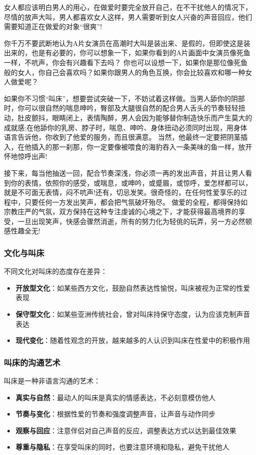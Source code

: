 \documentclass[12pt,UTF8]{ctexbook}
\begin{document}
女人都应该明白男人的用心，在做爱时要完全放开自己，在不干扰他人的情况下，尽情的放声大叫，男人都喜欢女人这样，男人需要听到女人兴奋的声音回应，他们需要知道正在做爱的对象“很爽”!

你千万不要武断地认为A片女演员在高潮时大叫是装出来、是假的，但即使这是装出来的，也是有必要的，你可以想象一下，如果你看到的A片画面中女演员像死鱼一样，不吭声，你会有兴趣看下去吗？
你也可以设想一下，如果你是那位像死鱼般的女人，你自己会喜欢吗？如果你跟男人的角色互换，你会比较喜欢和哪一种女人做爱呢？

如果你不习惯“叫床”，想要尝试突破一下，不妨试着这样做。当男人舔你的阴部时，你可以很自然的喘息呻吟，臀部及大腿很自然的配合男人舌头的节奏轻轻扭动，肚皮颤抖，眼睛闭上，表情陶醉，男人会因为能够替你制造快乐而产生莫大的成就感;在他舔你的乳房、脖子时，喘息、呻吟、身体扭动必须同时出现，用身体语言告诉他，你收到了他爱的服务，而且很满意。
当然，他最终一定要把阴茎插入，在他插入的那一刹那，你一定要像被喂食的海豹吞入一条美味的鱼一样，放开怀地惊呼出声!

接下来，每当他抽送一回，配合节奏深浅，你必须一再的发出声音，并且让男人看到你的表情，依照你的感受，或喘息，或呻吟，或蹙眉，或惊呼，爱怎样都可以，就是不可面无表情，闷不吭声!还有，切忌发笑。很奇怪的，在任何性爱享乐的过程中，只要任何一方发出笑声，都会把气氛破坏殆尽。
做爱的全程，都得保持如宗教庄严的气氛，双方保持在这种专注虔诚的心境之下，才能获得最高境界的享受，一旦出现笑声，快感会骤然消逝，所有的努力化为轻佻的玩弄，另一方必然顿感性趣全无!

\subsubsection{文化与叫床}
不同文化对叫床的态度存在差异：
\begin{itemize}
\item \textbf{开放型文化}：如某些西方文化，鼓励自然表达性愉悦，叫床被视为正常的性爱表现
\item \textbf{保守型文化}：如某些亚洲传统社会，曾对叫床持保守态度，认为应该克制声音表达
\item \textbf{现代变化}：随着性观念的开放，越来越多的人认识到叫床在性爱中的积极作用
\end{itemize}

\subsubsection{叫床的沟通艺术}
叫床是一种非语言沟通的艺术：
\begin{itemize}
\item \textbf{真实与自然}：最动人的叫床是真实的情感表达，不必刻意模仿他人
\item \textbf{节奏与变化}：根据性爱的节奏和强度调整声音，让声音与动作同步
\item \textbf{观察与回应}：注意伴侣对自己声音的反应，调整表达方式以达到最佳效果
\item \textbf{尊重与隐私}：在享受叫床的同时，也要注意环境和隐私，避免干扰他人
\end{itemize}
\end{document}

